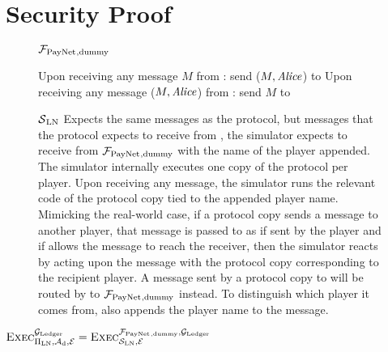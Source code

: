 \section{Security Proof}
  \begin{figure}[H]
    \begin{systembox}{$\mathcal{F}_{\mathrm{PayNet}}{}_{\mathrm{, dummy}}$}
      \begin{algorithmic}[1]
        \State Upon receiving any message $M$ from \alice:
        \Indent
            \State send ($M, \mathit{Alice}$) to \simulator
          \EndIf
        \EndIndent
        \State Upon receiving any message ($M, \mathit{Alice}$) from \simulator:
        \Indent
            \State send $M$ to \alice
          \EndIf
        \EndIndent
      \end{algorithmic}
    \end{systembox}
    \caption{}
    \label{alg:fpaynet:dummy}
  \end{figure}

  \begin{figure}[H]
    \begin{simulatorbox}{$\mathcal{S}{}_{\mathrm{LN}}$}
      Expects the same messages as the protocol, but messages that the protocol
      expects to receive from \environment, the simulator expects to receive
      from $\mathcal{F}_{\mathrm{PayNet}}{}_{\mathrm{, dummy}}$ with the name of the player appended.
      The simulator internally executes one copy of the protocol per player.
      Upon receiving any message, the simulator runs the relevant code of the
      protocol copy tied to the appended player name. Mimicking the real-world
      case, if a protocol copy sends a message to another player, that message
      is passed to \adversary{} as if sent by the player and if \adversary{}
      allows the message to reach the receiver, then the simulator reacts by
      acting upon the message with the protocol copy corresponding to the
      recipient player. A message sent by a protocol copy to \environment{} will
      be routed by \simulator{} to $\mathcal{F}_{\mathrm{PayNet}}{}_{\mathrm{, dummy}}$ instead. To
      distinguish which player it comes from, \simulator{} also appends the
      player name to the message.
    \end{simulatorbox}
    \caption{}
    \label{alg:sim:ln}
  \end{figure}

  \begin{lemma}
    \label{lemma:dummy}
    $\textsc{Exec}^{\mathcal{G}_{\mathrm{Ledger}}}_{\Pi_{\mathrm{LN}}, \mathcal{A}_{\mathrm{d}},
    \mathcal{E}} = \textsc{Exec}^{\mathcal{F}_{\mathrm{PayNet}}{}_{\mathrm{, dummy}},
    \mathcal{G}_{\mathrm{Ledger}}}_{\mathcal{S}_{\mathrm{LN}}, \mathcal{E}}$
  \end{lemma}

